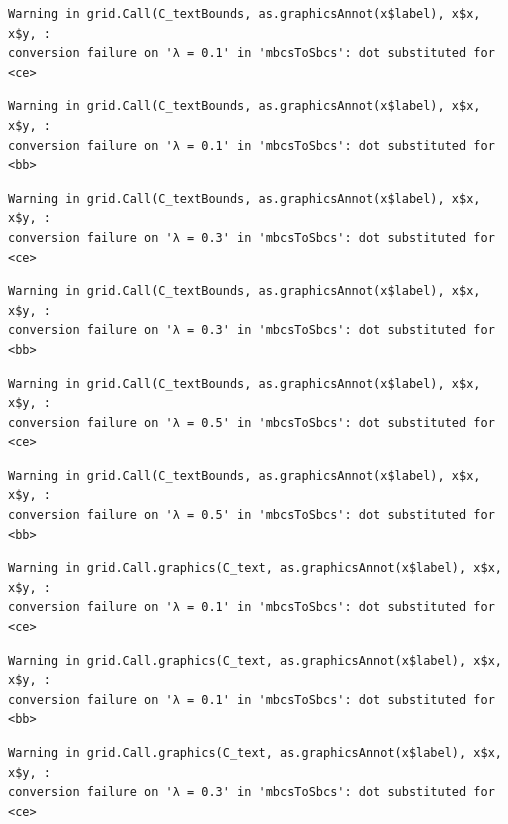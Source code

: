 \documentclass[
  spanish,
  a4paper,
]{scrreport}
\theoremstyle{plain}
\theoremstyle{definition}
\theoremstyle{definition}
\theoremstyle{remark}
\begin{document}
\begin{verbatim}
Warning in grid.Call(C_textBounds, as.graphicsAnnot(x$label), x$x, x$y, :
conversion failure on 'λ = 0.1' in 'mbcsToSbcs': dot substituted for <ce>
\end{verbatim}

\begin{verbatim}
Warning in grid.Call(C_textBounds, as.graphicsAnnot(x$label), x$x, x$y, :
conversion failure on 'λ = 0.1' in 'mbcsToSbcs': dot substituted for <bb>
\end{verbatim}

\begin{verbatim}
Warning in grid.Call(C_textBounds, as.graphicsAnnot(x$label), x$x, x$y, :
conversion failure on 'λ = 0.3' in 'mbcsToSbcs': dot substituted for <ce>
\end{verbatim}

\begin{verbatim}
Warning in grid.Call(C_textBounds, as.graphicsAnnot(x$label), x$x, x$y, :
conversion failure on 'λ = 0.3' in 'mbcsToSbcs': dot substituted for <bb>
\end{verbatim}

\begin{verbatim}
Warning in grid.Call(C_textBounds, as.graphicsAnnot(x$label), x$x, x$y, :
conversion failure on 'λ = 0.5' in 'mbcsToSbcs': dot substituted for <ce>
\end{verbatim}

\begin{verbatim}
Warning in grid.Call(C_textBounds, as.graphicsAnnot(x$label), x$x, x$y, :
conversion failure on 'λ = 0.5' in 'mbcsToSbcs': dot substituted for <bb>
\end{verbatim}

\begin{verbatim}
Warning in grid.Call.graphics(C_text, as.graphicsAnnot(x$label), x$x, x$y, :
conversion failure on 'λ = 0.1' in 'mbcsToSbcs': dot substituted for <ce>
\end{verbatim}

\begin{verbatim}
Warning in grid.Call.graphics(C_text, as.graphicsAnnot(x$label), x$x, x$y, :
conversion failure on 'λ = 0.1' in 'mbcsToSbcs': dot substituted for <bb>
\end{verbatim}

\begin{verbatim}
Warning in grid.Call.graphics(C_text, as.graphicsAnnot(x$label), x$x, x$y, :
conversion failure on 'λ = 0.3' in 'mbcsToSbcs': dot substituted for <ce>
\end{verbatim}
\end{document}
